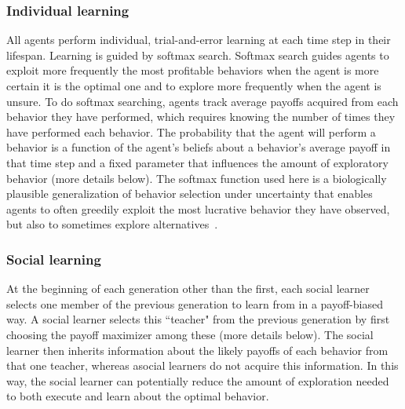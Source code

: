 \documentclass[letterpaper,11.5pt]{scrartcl}
\begin{document}
\subsubsection{Individual learning}

All agents perform individual, trial-and-error learning at each time step in
their lifespan.  Learning is guided by softmax search. Softmax search
guides agents to exploit more frequently the most profitable behaviors when the
agent is more certain it is the optimal one and to explore more frequently when the
agent is unsure. To do softmax searching, agents track average payoffs acquired
from each behavior they have performed, which requires knowing the number of times they have performed each behavior. The probability that the agent will perform a behavior is a function of the agent's beliefs about a behavior's average payoff in that time step and a fixed parameter that influences the amount of exploratory behavior (more details below). The softmax function used here is a biologically plausible generalization of behavior selection under uncertainty that enables agents to often greedily exploit the most lucrative behavior they have observed, but also to sometimes explore alternatives~\citep{Schulz2019,Collins2013,Daw2006,Yechiam2005}.


\subsubsection{Social learning}

At the beginning of each generation other than the first, each social learner selects
one member of the previous generation to learn from in a payoff-biased way. 
A social learner selects this ``teacher" from the previous generation by first
choosing the payoff maximizer among these (more details below).  The social learner then inherits information about the likely payoffs of each behavior from that one teacher, whereas asocial learners do not acquire this information. In this way, the social learner can potentially reduce the amount of exploration needed to both execute and learn about the optimal behavior.  


\end{document}
